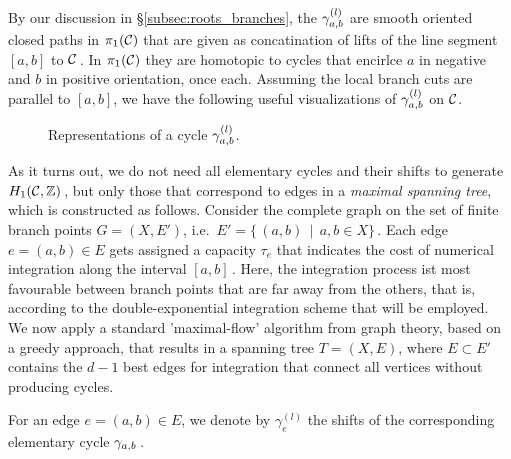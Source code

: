 \documentclass[main.tex]{subfiles}
\begin{document}
   By our discussion in \S \ref{subsec:roots_branches}, the $\gamma_{a,b}^{(l)}$ are smooth oriented closed paths in $\pi_1(\mathcal{C})$ that are given as concatination of
   lifts of the line segment $[a,b]$ to $\mathcal{C}$\,. \abstand
   In $\pi_1(\mathcal{C})$
   they are homotopic to cycles that encirlce  $a$ in negative and $b$ in positive orientation, once each.
   Assuming the local branch cuts are parallel to $[a,b]$, we have the following useful visualizations of $\gamma_{a,b}^{(l)}$ on $\mathcal{C}$.
   \begin{figure}[H]
      \begin{center}
	  
      \end{center}
    \caption{Representations of a cycle $\gamma_{a,b}^{(l)}$.} 
    \label{fig:elem_cycle}
\end{figure}
 
  \bigskip
 
  As it turns out, we do not need all elementary cycles and their shifts to generate $H_1(\mathcal{C},\mathbb{Z})$\,, but only those that correspond to edges in a \emph{maximal spanning tree}, which is constructed
  as follows. \abstand
   Consider the complete graph on the set of finite branch points $G = (X,E')$, i.e.\ $E' = \{ \, (a,b) \, \mid \, a,b \in X \}$\,.
   Each edge $e = (a,b) \in E$ gets assigned a capacity $\tau_e$ that indicates the cost of numerical integration along the interval $[a,b]$\,. \abstand
   Here, the integration process ist most favourable
   between branch points that are far away from the others, that is, according to the double-exponential integration scheme that will be employed. \abstand
   We now apply a standard 'maximal-flow' algorithm from graph theory, based on a greedy approach, that results in a spanning tree $T = (X,E)$, where $E \subset E'$ contains the $d-1$ best edges
   for integration that connect all vertices without producing cycles.
   
   \bigskip
  
  For an edge $e = (a,b) \in E$, we denote by $\gamma_e^{(l)}$ the shifts of the corresponding elementary cycle $\gamma_{a,b}$\,.
  
\end{document}
